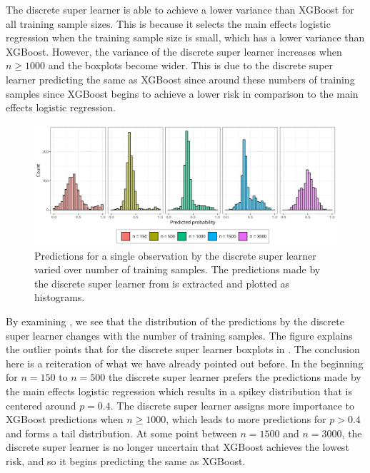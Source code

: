 \documentclass[./main.tex]{subfiles}
\begin{document}
The discrete super learner is able to achieve a lower variance than XGBoost for all training sample sizes. This is because it selects the main effects logistic regression when the training sample size is small, which has a lower variance than XGBoost. However, the variance of the discrete super learner increases when $ n \geq 1000 $ and the boxplots become wider. This is due to the discrete super learner predicting the same as XGBoost since around these numbers of training samples since XGBoost begins to achieve a lower risk in comparison to the main effects logistic regression. 

\begin{figure}[H]
    \centering
    \includegraphics[width=\textwidth]{figures/preds_dsl_shift.png}
    \caption{Predictions for a single observation by the discrete super learner varied over number of training samples. The predictions made by the discrete super learner from  is extracted and plotted as histograms.}
    \label{fig:dsl_shift}
\end{figure}
By examining , we see that the distribution of the predictions by the discrete super learner changes with the number of training samples. The figure explains the outlier points that for the discrete super learner boxplots in . The conclusion here is a reiteration of what we have already pointed out before. In the beginning for $ n = 150 $ to $ n = 500 $ the discrete super learner prefers the predictions made by the main effects logistic regression which results in a spikey distribution that is centered around $ p = 0.4 $. The discrete super learner assigns more importance to XGBoost predictions when $n \geq 1000$, which leads to more predictions for $p > 0.4$ and forms a tail distribution. At some point between $ n = 1500 $ and $ n = 3000 $, the discrete super learner is no longer uncertain that XGBoost achieves the lowest risk, and so it begins predicting the same as XGBoost. 
\end{document}
